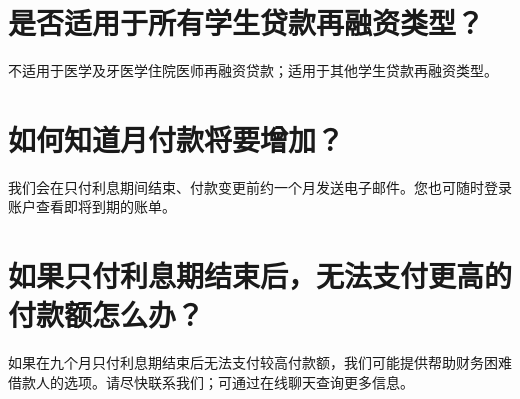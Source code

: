 \documentclass[UTF8,fontset=none,11pt,a4paper]{ctexart}
\begin{document}
\section*{是否适用于所有学生贷款再融资类型？}
不适用于医学及牙医学住院医师再融资贷款；适用于其他学生贷款再\allowbreak\mbox{融资类型。}


\section*{如何知道月付款将要增加？}
我们会在只付利息期间结束、付款变更前约一个月发送电子邮件。您也可随时登录账户查看即将到\allowbreak\mbox{期的账单。}


\section*{如果只付利息期结束后，无法支付更高的付款额怎么办？}
如果在九个月只付利息期结束后无法支付较高付款额，我们可能提供帮助财务困难借款人的选项。请尽快联系我们；可通过在线聊天查询\allowbreak\mbox{更多信息。}
\end{document}
